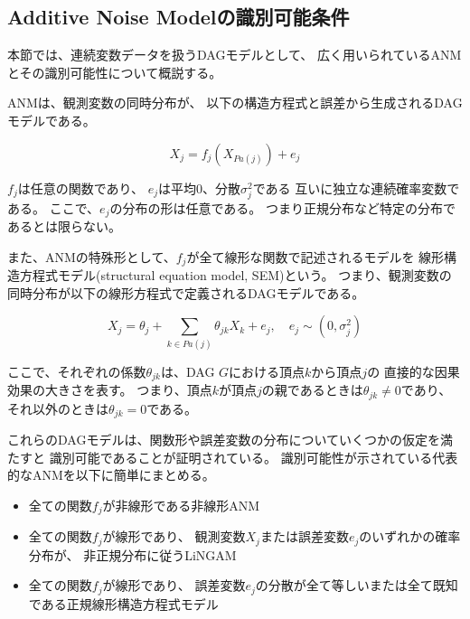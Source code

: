 
\subsection{Additive Noise Modelの識別可能条件}

本節では、連続変数データを扱うDAGモデルとして、
広く用いられているANM
\cite{Shimizu2006-yu}
\cite{Hoyer2008-oo}
\cite{Peters2013-eb}
\cite{Peters2014-ro}
\cite{Park2020-ey}
とその識別可能性について概説する。

ANMは、観測変数の同時分布が、
以下の構造方程式と誤差から生成されるDAGモデルである。

\begin{equation}
  X_j = f_j(X_{Pa(j)}) + e_j
  \label{def:ANM}
\end{equation}

$f_j$は任意の関数であり、
$e_j$は平均0、分散$\sigma_j^2$である
互いに独立な連続確率変数である。
ここで、$e_j$の分布の形は任意である。
つまり正規分布など特定の分布であるとは限らない。

また、ANMの特殊形として、$f_j$が全て線形な関数で記述されるモデルを
線形構造方程式モデル(structural equation model, SEM)という。
つまり、観測変数の同時分布が以下の線形方程式で定義されるDAGモデルである。

\begin{equation}
  X_j = \theta_j + \sum_{k \in Pa(j)} \theta_{jk} X_k + e_j, \quad e_j \sim (0, \sigma_j^2)
\end{equation}

ここで、それぞれの係数$\theta_{jk}$は、DAG $G$における頂点$k$から頂点$j$の
直接的な因果効果の大きさを表す。
つまり、頂点$k$が頂点$j$の親であるときは$\theta_{jk} \neq 0$であり、
それ以外のときは$\theta_{jk}=0$である。

これらのDAGモデルは、関数形や誤差変数の分布についていくつかの仮定を満たすと
識別可能であることが証明されている。
識別可能性が示されている代表的なANMを以下に簡単にまとめる。

\begin{itemize}
  \item
  全ての関数$f_j$が非線形である非線形ANM\cite{Hoyer2008-oo}

  \item
  全ての関数$f_j$が線形であり、
  観測変数$X_j$または誤差変数$e_j$のいずれかの確率分布が、
  非正規分布に従うLiNGAM\cite{Shimizu2006-yu}

  \item
  全ての関数$f_j$が線形であり、
  誤差変数$e_j$の分散が全て等しいまたは全て既知である正規線形構造方程式モデル\cite{Peters2013-eb}
\end{itemize}

